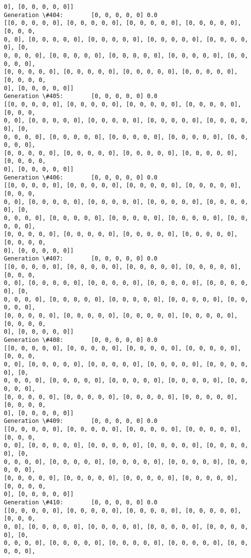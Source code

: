 \documentclass[11pt]{article}
\begin{document}
\begin{Verbatim}[commandchars=\\\{\}]
0], [0, 0, 0, 0, 0]]
Generation \#404:        [0, 0, 0, 0, 0] 0.0
[[0, 0, 0, 0, 0], [0, 0, 0, 0, 0], [0, 0, 0, 0, 0], [0, 0, 0, 0, 0], [0, 0, 0,
0, 0], [0, 0, 0, 0, 0], [0, 0, 0, 0, 0], [0, 0, 0, 0, 0], [0, 0, 0, 0, 0], [0,
0, 0, 0, 0], [0, 0, 0, 0, 0], [0, 0, 0, 0, 0], [0, 0, 0, 0, 0], [0, 0, 0, 0, 0],
[0, 0, 0, 0, 0], [0, 0, 0, 0, 0], [0, 0, 0, 0, 0], [0, 0, 0, 0, 0], [0, 0, 0, 0,
0], [0, 0, 0, 0, 0]]
Generation \#405:        [0, 0, 0, 0, 0] 0.0
[[0, 0, 0, 0, 0], [0, 0, 0, 0, 0], [0, 0, 0, 0, 0], [0, 0, 0, 0, 0], [0, 0, 0,
0, 0], [0, 0, 0, 0, 0], [0, 0, 0, 0, 0], [0, 0, 0, 0, 0], [0, 0, 0, 0, 0], [0,
0, 0, 0, 0], [0, 0, 0, 0, 0], [0, 0, 0, 0, 0], [0, 0, 0, 0, 0], [0, 0, 0, 0, 0],
[0, 0, 0, 0, 0], [0, 0, 0, 0, 0], [0, 0, 0, 0, 0], [0, 0, 0, 0, 0], [0, 0, 0, 0,
0], [0, 0, 0, 0, 0]]
Generation \#406:        [0, 0, 0, 0, 0] 0.0
[[0, 0, 0, 0, 0], [0, 0, 0, 0, 0], [0, 0, 0, 0, 0], [0, 0, 0, 0, 0], [0, 0, 0,
0, 0], [0, 0, 0, 0, 0], [0, 0, 0, 0, 0], [0, 0, 0, 0, 0], [0, 0, 0, 0, 0], [0,
0, 0, 0, 0], [0, 0, 0, 0, 0], [0, 0, 0, 0, 0], [0, 0, 0, 0, 0], [0, 0, 0, 0, 0],
[0, 0, 0, 0, 0], [0, 0, 0, 0, 0], [0, 0, 0, 0, 0], [0, 0, 0, 0, 0], [0, 0, 0, 0,
0], [0, 0, 0, 0, 0]]
Generation \#407:        [0, 0, 0, 0, 0] 0.0
[[0, 0, 0, 0, 0], [0, 0, 0, 0, 0], [0, 0, 0, 0, 0], [0, 0, 0, 0, 0], [0, 0, 0,
0, 0], [0, 0, 0, 0, 0], [0, 0, 0, 0, 0], [0, 0, 0, 0, 0], [0, 0, 0, 0, 0], [0,
0, 0, 0, 0], [0, 0, 0, 0, 0], [0, 0, 0, 0, 0], [0, 0, 0, 0, 0], [0, 0, 0, 0, 0],
[0, 0, 0, 0, 0], [0, 0, 0, 0, 0], [0, 0, 0, 0, 0], [0, 0, 0, 0, 0], [0, 0, 0, 0,
0], [0, 0, 0, 0, 0]]
Generation \#408:        [0, 0, 0, 0, 0] 0.0
[[0, 0, 0, 0, 0], [0, 0, 0, 0, 0], [0, 0, 0, 0, 0], [0, 0, 0, 0, 0], [0, 0, 0,
0, 0], [0, 0, 0, 0, 0], [0, 0, 0, 0, 0], [0, 0, 0, 0, 0], [0, 0, 0, 0, 0], [0,
0, 0, 0, 0], [0, 0, 0, 0, 0], [0, 0, 0, 0, 0], [0, 0, 0, 0, 0], [0, 0, 0, 0, 0],
[0, 0, 0, 0, 0], [0, 0, 0, 0, 0], [0, 0, 0, 0, 0], [0, 0, 0, 0, 0], [0, 0, 0, 0,
0], [0, 0, 0, 0, 0]]
Generation \#409:        [0, 0, 0, 0, 0] 0.0
[[0, 0, 0, 0, 0], [0, 0, 0, 0, 0], [0, 0, 0, 0, 0], [0, 0, 0, 0, 0], [0, 0, 0,
0, 0], [0, 0, 0, 0, 0], [0, 0, 0, 0, 0], [0, 0, 0, 0, 0], [0, 0, 0, 0, 0], [0,
0, 0, 0, 0], [0, 0, 0, 0, 0], [0, 0, 0, 0, 0], [0, 0, 0, 0, 0], [0, 0, 0, 0, 0],
[0, 0, 0, 0, 0], [0, 0, 0, 0, 0], [0, 0, 0, 0, 0], [0, 0, 0, 0, 0], [0, 0, 0, 0,
0], [0, 0, 0, 0, 0]]
Generation \#410:        [0, 0, 0, 0, 0] 0.0
[[0, 0, 0, 0, 0], [0, 0, 0, 0, 0], [0, 0, 0, 0, 0], [0, 0, 0, 0, 0], [0, 0, 0,
0, 0], [0, 0, 0, 0, 0], [0, 0, 0, 0, 0], [0, 0, 0, 0, 0], [0, 0, 0, 0, 0], [0,
0, 0, 0, 0], [0, 0, 0, 0, 0], [0, 0, 0, 0, 0], [0, 0, 0, 0, 0], [0, 0, 0, 0, 0],

\end{Verbatim}
\end{document}
